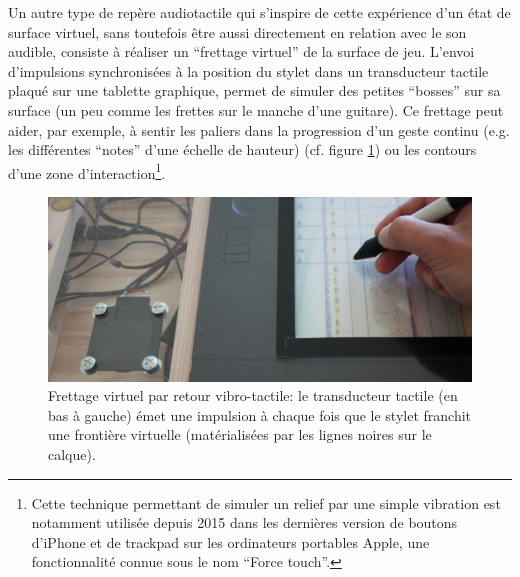 \indent Un autre type de repère audiotactile qui s'inspire de cette expérience d'un état de surface virtuel, sans toutefois être aussi directement en relation avec le son audible, consiste à réaliser un ``frettage virtuel'' de la surface de jeu. L'envoi d'impulsions synchronisées à la position du stylet dans un transducteur tactile plaqué sur une tablette graphique, permet de simuler des petites ``bosses'' sur sa surface (un peu comme les frettes sur le manche d'une guitare). Ce frettage peut aider, par exemple, à sentir les paliers dans la progression d'un geste continu (e.g. les différentes ``notes'' d'une échelle de hauteur) (cf. figure \ref{fig:interface:virtual-fretting}) ou les contours d'une zone d'interaction\footnote{Cette technique permettant de simuler un relief par une simple vibration est notamment utilisée depuis 2015 dans les dernières version de boutons d'iPhone et de trackpad sur les ordinateurs portables Apple, une fonctionnalité connue sous le nom ``Force touch''.}.\\

\begin{figure}[!htbp]
	\captionsetup{format=plain}%
	\includegraphics[width=\textwidth]{gfx/05_interfaces/virtual-fretting.jpg}
	\caption[Frettage virtuel par retour vibro-tactile]{Frettage virtuel par retour vibro-tactile: le transducteur tactile (en bas à gauche) émet une impulsion à chaque fois que le stylet franchit une frontière virtuelle (matérialisées par les lignes noires sur le calque).}
	\label{fig:interface:virtual-fretting}
\end{figure}


